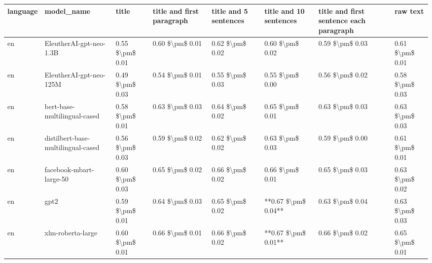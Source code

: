 \begin{tabular}{llllllll}
\toprule
language &                         model\_name &           title & title and first paragraph & title and 5 sentences & title and 10 sentences & title and first sentence each paragraph &            raw text \\
\midrule
      en &            EleutherAI-gpt-neo-1.3B & 0.55 \$\textbackslash pm\$ 0.01 &           0.60 \$\textbackslash pm\$ 0.01 &       0.62 \$\textbackslash pm\$ 0.02 &        0.60 \$\textbackslash pm\$ 0.02 &                         0.59 \$\textbackslash pm\$ 0.03 &     0.61 \$\textbackslash pm\$ 0.01 \\
      en &            EleutherAI-gpt-neo-125M & 0.49 \$\textbackslash pm\$ 0.03 &           0.54 \$\textbackslash pm\$ 0.01 &       0.55 \$\textbackslash pm\$ 0.03 &        0.55 \$\textbackslash pm\$ 0.00 &                         0.56 \$\textbackslash pm\$ 0.02 &     0.58 \$\textbackslash pm\$ 0.03 \\
      en &       bert-base-multilingual-cased & 0.58 \$\textbackslash pm\$ 0.01 &           0.63 \$\textbackslash pm\$ 0.03 &       0.64 \$\textbackslash pm\$ 0.02 &        0.65 \$\textbackslash pm\$ 0.01 &                         0.63 \$\textbackslash pm\$ 0.03 &     0.63 \$\textbackslash pm\$ 0.03 \\
      en & distilbert-base-multilingual-cased & 0.56 \$\textbackslash pm\$ 0.03 &           0.59 \$\textbackslash pm\$ 0.02 &       0.62 \$\textbackslash pm\$ 0.02 &        0.63 \$\textbackslash pm\$ 0.03 &                         0.59 \$\textbackslash pm\$ 0.00 &     0.61 \$\textbackslash pm\$ 0.01 \\
      en &            facebook-mbart-large-50 & 0.60 \$\textbackslash pm\$ 0.03 &           0.65 \$\textbackslash pm\$ 0.02 &       0.66 \$\textbackslash pm\$ 0.02 &        0.66 \$\textbackslash pm\$ 0.01 &                         0.65 \$\textbackslash pm\$ 0.03 &     0.63 \$\textbackslash pm\$ 0.02 \\
      en &                               gpt2 & 0.59 \$\textbackslash pm\$ 0.01 &           0.64 \$\textbackslash pm\$ 0.03 &       0.65 \$\textbackslash pm\$ 0.02 &    **0.67 \$\textbackslash pm\$ 0.04** &                         0.63 \$\textbackslash pm\$ 0.04 &     0.63 \$\textbackslash pm\$ 0.03 \\
      en &                  xlm-roberta-large & 0.60 \$\textbackslash pm\$ 0.01 &           0.66 \$\textbackslash pm\$ 0.01 &       0.66 \$\textbackslash pm\$ 0.02 &    **0.67 \$\textbackslash pm\$ 0.01** &                         0.66 \$\textbackslash pm\$ 0.02 &     0.65 \$\textbackslash pm\$ 0.01 \\

\end{tabular}
